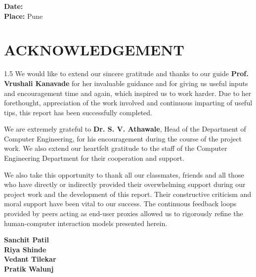 \documentclass[12pt, a4paper]{report}
\begin{document}
\vspace{0.5cm}
\noindent
\textbf{Date:} \\
\textbf{Place:} Pune

\chapter*{ACKNOWLEDGEMENT}
\begin{spacing}{1.5}
We would like to extend our sincere gratitude and thanks to our guide \textbf{Prof. Vrushali Kanavade} for her invaluable guidance and for giving us useful inputs and encouragement time and again, which inspired us to work harder. Due to her forethought, appreciation of the work involved and continuous imparting of useful tips, this report has been successfully completed.

We are extremely grateful to \textbf{Dr. S. V. Athawale}, Head of the Department of Computer Engineering, for his encouragement during the course of the project work. We also extend our heartfelt gratitude to the staff of the Computer Engineering Department for their cooperation and support.

We also take this opportunity to thank all our classmates, friends and all those who have directly or indirectly provided their overwhelming support during our project work and the development of this report. Their constructive criticism and moral support have been vital to our success. The continuous feedback loops provided by peers acting as end-user proxies allowed us to rigorously refine the human-computer interaction models presented herein.
\end{spacing}

\vspace{2cm}
\begin{flushright}
    \textbf{Sanchit Patil} \\
    \textbf{Riya Shinde} \\
    \textbf{Vedant Tilekar} \\
    \textbf{Pratik Walunj}
\end{flushright}

\end{document}

